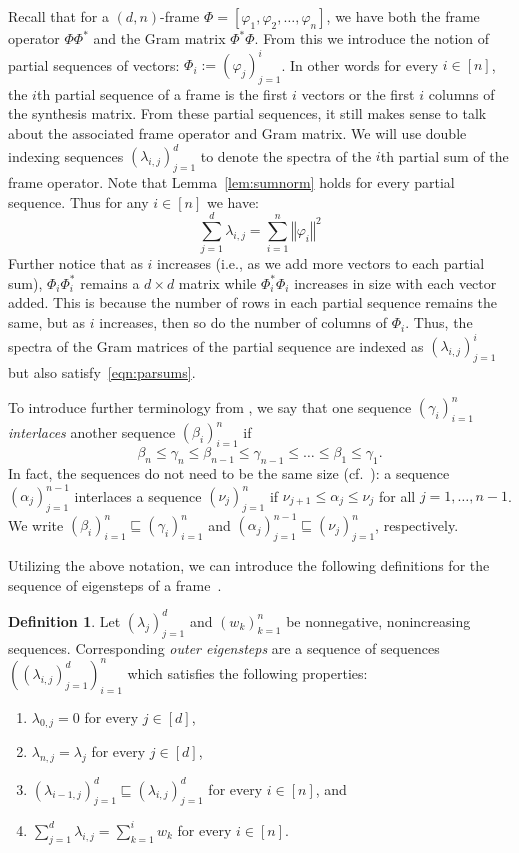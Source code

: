 \documentclass[10pt]{article}
\theoremstyle{plain}
\theoremstyle{definition}
\newtheorem{definition}[thm]{Definition}
\renewcommand{\phi}{\varphi}
\newcommand{\frameop}{\Phi\Phi^\ast}
\newcommand{\gram}{\Phi^\ast\Phi}
\newcommand{\norm}[1]{\left\Vert#1\right\Vert}
\begin{document}
Recall that for a $(d,n)$-frame $\Phi = [ \phi_1, \phi_2, \dots, \phi_n]$, we have both the frame operator $\frameop$ and the Gram matrix $\gram$. From this we introduce the notion of partial sequences of vectors: $\Phi_i := ( \phi_{j})^i_{j=1}$. In other words for every $i\in [n]$, the $i$th partial sequence of a frame is the first $i$ vectors or the first $i$ columns of the synthesis matrix. From these partial sequences, it still makes sense to talk about the associated frame operator and Gram matrix.  We will use double indexing sequences $(\lambda_{i,j})_{j=1}^d$ to denote the spectra of the $i$th partial sum of the frame operator. Note that Lemma~\ref{lem:sumnorm} holds for every partial sequence. Thus for any $i \in [n]$ we have:
\begin{equation}\label{eqn:parsums}
    \sum_{j=1}^d \lambda_{i,j} = \sum_{i=1}^n \norm{\phi_i}^2
\end{equation}
Further notice that as $i$ increases (i.e., as we add more vectors to each partial sum), $\Phi_i\Phi_i^\ast$ remains a $d \times d$ matrix while $\Phi_i^\ast\Phi_i$ increases in size with each vector added. This is because the number of rows in each partial sequence remains the same, but as $i$ increases, then so do the number of columns of $\Phi_i$.  Thus, the spectra of the Gram matrices of the partial sequence are indexed as $(\lambda_{i,j})_{j=1}^i$ but also satisfy~\eqref{eqn:parsums}.

To introduce further terminology from \cite{cfmconstructingfiniteframes}, we say that one sequence $( \gamma_i)^n_{i=1}$ \emph{interlaces} another sequence $( \beta_i)^n_{i=1}$ if $$ \beta_n \leq \gamma_n \leq \beta_{n-1} \leq \gamma_{n-1} \leq \dots \leq \beta_1 \leq \gamma_1.$$ In fact, the sequences do not need to be the same size (cf.\ \cite{cfpconstructingselfadjoint}): a sequence $ ( \alpha_j)^{n-1}_{j=1}$ interlaces a sequence $( \nu_j)^n_{j=1}$ if $\nu_{j+1} \leq \alpha_j \leq \nu_j$ for all $j= 1, \dots, n-1$. We write $(\beta_i)^n_{i=1} \sqsubseteq (\gamma_i)^n_{i=1}$ and $(\alpha_j)^{n-1}_{j=1} \sqsubseteq (\nu_j)^n_{j=1}$, respectively.

Utilizing the above notation, we can introduce the following definitions for the sequence of eigensteps of a frame~\cite{cfmconstructingfiniteframes,cfpconstructingselfadjoint}.

\begin{definition}\label{outerdef}
Let $(\lambda_j)^d_{j=1}$ and $(w_k)^n_{k=1}$ be nonnegative, nonincreasing sequences. Corresponding \emph{outer eigensteps} are a sequence of sequences $((\lambda_{i,j})^d_{j=1})^n_{i=1}$ which satisfies the following properties: 
\begin{enumerate}
\item $\lambda_{0,j}=0$ for every $j\in [d]$,
\item $\lambda_{n,j}=\lambda_j$ for every $j\in [d]$,
\item $(\lambda_{i-1,j})^d_{j=1} \sqsubseteq ( \lambda_{i,j})^d_{j=1}$ for every $i \in [n]$, and
\item $\sum^d_{j=1} \lambda_{i,j} = \sum^i_{k=1}w_k$ for every $i \in [n]$. 
\end{enumerate}
\end{definition}
\end{document}
